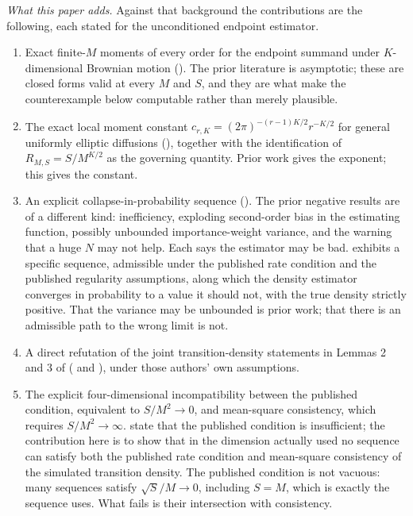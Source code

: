 \documentclass[11pt]{article}
\theoremstyle{definition}
\begin{document}
\emph{What this paper adds.} Against that background the contributions are the following, each stated for the unconditioned endpoint estimator.
\begin{enumerate}[label=(\alph*)]
\item Exact finite-$M$ moments of every order for the endpoint summand under $K$-dimensional Brownian motion (). The prior literature is asymptotic; these are closed forms valid at every $M$ and $S$, and they are what make the counterexample below computable rather than merely plausible.
\item The exact local moment constant $c_{r,K}=(2\pi)^{-(r-1)K/2}r^{-K/2}$ for general uniformly elliptic diffusions (), together with the identification of $R_{M,S}=S/M^{K/2}$ as the governing quantity. Prior work gives the exponent; this gives the constant.
\item An explicit collapse-in-probability sequence (). The prior negative results are of a different kind: inefficiency, exploding second-order bias in the estimating function, possibly unbounded importance-weight variance, and the warning that a huge $N$ may not help. Each says the estimator may be bad.  exhibits a specific sequence, admissible under the published rate condition and the published regularity assumptions, along which the density estimator converges in probability to a value it should not, with the true density strictly positive. That the variance may be unbounded is prior work; that there is an admissible path to the wrong limit is not.
\item A direct refutation of the joint transition-density statements in Lemmas 2 and 3 of \citet{BrandtSantaClara2002} ( and ), under those authors' own assumptions.
\item The explicit four-dimensional incompatibility between the published condition, equivalent to $S/M^2\to0$, and mean-square consistency, which requires $S/M^2\to\infty$. \citet{DetempleGarciaRindisbacher2006} state that the published condition is insufficient; the contribution here is to show that in the dimension actually used no sequence can satisfy both the published rate condition and mean-square consistency of the simulated transition density. The published condition is not vacuous: many sequences satisfy $\sqrt S/M\to0$, including $S=M$, which is exactly the sequence  uses. What fails is their intersection with consistency.

\end{enumerate}
\end{document}
